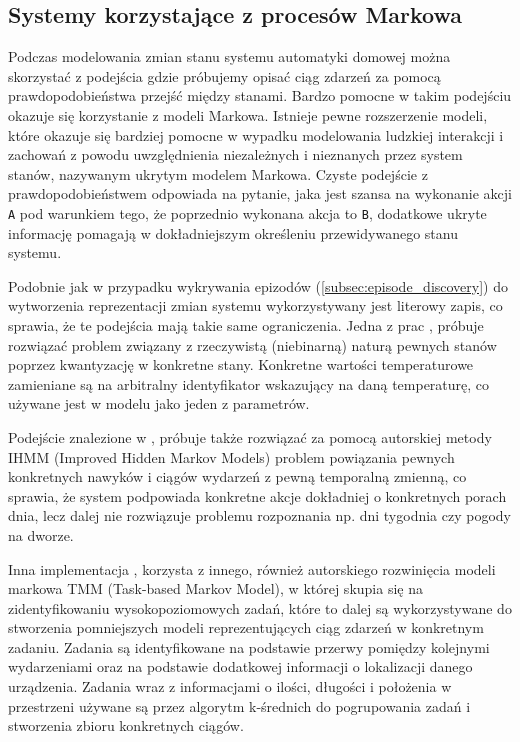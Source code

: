 \subsection{Systemy korzystające z procesów Markowa}
Podczas modelowania zmian stanu systemu automatyki domowej można skorzystać z podejścia gdzie próbujemy opisać ciąg zdarzeń za pomocą prawdopodobieństwa przejść między stanami. Bardzo pomocne w takim podejściu okazuje się korzystanie z modeli Markowa. Istnieje pewne rozszerzenie modeli, które okazuje się bardziej pomocne w wypadku modelowania ludzkiej interakcji i zachowań z powodu uwzględnienia niezależnych i nieznanych przez system stanów, nazywanym ukrytym modelem Markowa. Czyste podejście z prawdopodobieństwem odpowiada na pytanie, jaka jest szansa na wykonanie akcji \verb+A+ pod warunkiem tego, że poprzednio wykonana akcja to \verb+B+, dodatkowe ukryte informację pomagają w dokładniejszym określeniu przewidywanego stanu systemu.

Podobnie jak w przypadku wykrywania epizodów (\ref{subsec:episode_discovery}) do wytworzenia reprezentacji zmian systemu wykorzystywany jest literowy zapis, co sprawia, że te podejścia mają takie same ograniczenia. Jedna z prac \cite{markov_1}, próbuje rozwiązać problem związany z rzeczywistą (niebinarną) naturą pewnych stanów poprzez kwantyzację w konkretne stany. Konkretne wartości temperaturowe zamieniane są na arbitralny identyfikator wskazujący na daną temperaturę, co używane jest w modelu jako jeden z parametrów.

Podejście znalezione w \cite{markov_1}, próbuje także rozwiązać za pomocą autorskiej metody IHMM (Improved Hidden Markov Models) problem powiązania pewnych konkretnych nawyków i ciągów wydarzeń z pewną temporalną zmienną, co sprawia, że system podpowiada konkretne akcje dokładniej o konkretnych porach dnia, lecz dalej nie rozwiązuje problemu rozpoznania np. dni tygodnia czy pogody na dworze.

Inna implementacja \cite{markov_2}, korzysta z innego, również autorskiego rozwinięcia modeli markowa TMM (Task-based Markov Model), w której skupia się na zidentyfikowaniu wysokopoziomowych zadań, które to dalej są wykorzystywane do stworzenia pomniejszych modeli reprezentujących ciąg zdarzeń w konkretnym zadaniu. Zadania są identyfikowane na podstawie przerwy pomiędzy kolejnymi wydarzeniami oraz na podstawie dodatkowej informacji o lokalizacji danego urządzenia. Zadania wraz z informacjami o ilości, długości i położenia w przestrzeni używane są przez algorytm k-średnich do pogrupowania zadań i stworzenia zbioru konkretnych ciągów.


